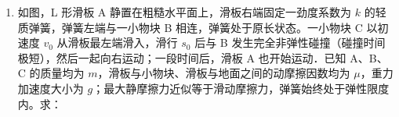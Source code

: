 \documentclass[\gkver]{gaokaozhenti}
\begin{document}
\begin{enumerate}
\begin{enumerate}
	\item
	武大靖从静止出发，先沿直道加速滑行，前 $8\Um$ 用时 $2\Us$。该过程可视为匀加速直线运动，求此过程加速度大小；
	\item
	武大靖途中某次过弯时的运动可视为半径为 $10\Um$ 的匀速圆周运动，速度大小为 $14\Ums$。已知武大靖的质量为 $73\Ukg$，求此次过弯时所需的向心力大小；
	\item
	武大靖通过侧身来调整身体与水平冰面的夹角，使场地对其作用力指向身体重心而实现平稳过弯，如图所示。求武大靖在（2）问中过弯时身体与水平面的夹角 $\theta$ 的大小。（不计空气阻力，重力加速度大小取 $10\Umsq$，$\tan 22^\circ=0.40$、$\tan 27^\circ=0.51$、$\tan 32^\circ=0.62$、$\tan 37^\circ=0.75$）
\end{enumerate}



\item
如图，L 形滑板 A 静置在粗糙水平面上，滑板右端固定一劲度系数为 $k$ 的轻质弹簧，弹簧左端与一小物块 B 相连，弹簧处于原长状态。一小物块 C 以初速度 $v_{0}$ 从滑板最左端滑入，滑行 $s_{0}$ 后与 B 发生完全非弹性碰撞（碰撞时间极短），然后一起向右运动；一段时间后，滑板 A 也开始运动．已知 A、B、C 的质量均为 $m$，滑板与小物块、滑板与地面之间的动摩擦因数均为 $\mu$，重力加速度大小为 $g$；最大静摩擦力近似等于滑动摩擦力，弹簧始终处于弹性限度内。求：


\end{enumerate}
\end{document}
